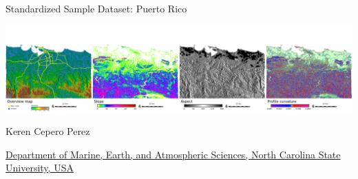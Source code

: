 \documentclass[xcolor={dvipsnames,usenames},beamer]{beamer}
\begin{document}
\begin{frame}{Standardized Sample Dataset: Puerto Rico}

\begin{center}
\includegraphics[width=\textwidth]{./images/dataset/std_dataset_pr_stripe.png}
\end{center}

Keren Cepero Perez

{\scriptsize
\href{http://www.meas.ncsu.edu/}%
{Department of Marine, Earth, and Atmospheric Sciences,
North Carolina State University, USA}
}

\end{frame}
\end{document}
